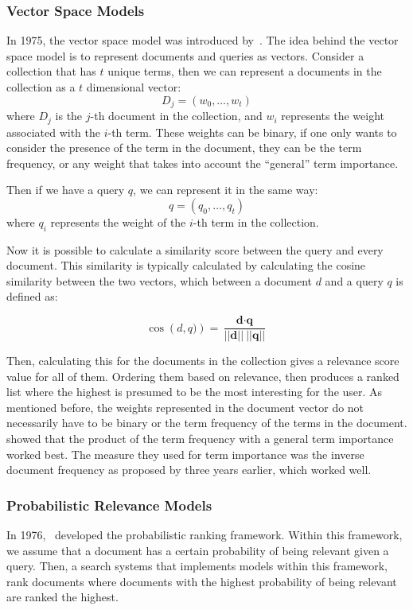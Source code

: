 \subsubsection{Vector Space Models}
In 1975, the vector space model was introduced by~\citet{VectorSpaceModel}. The idea behind the vector space model is to represent documents and queries as vectors. Consider a collection that has $t$ unique terms, then we can represent a documents in the collection as a $t$ dimensional vector:
\begin{equation}
	D_j = (w_0, \ldots, w_t)
\end{equation}
where $D_j$ is the $j$-th document in the collection, and $w_i$ represents the weight associated with the $i$-th term. These weights can be binary, if one only wants to consider the presence of the term in the document, they can be the term frequency, or any weight that takes into account the ``general'' term importance. 

Then if we have a query $q$, we can represent it in the same way:
\begin{equation}
	q = (q_0, \ldots, q_t)
\end{equation}
where $q_i$ represents the weight of the $i$-th term in the collection. 

Now it is possible to calculate a similarity score between the query and every document. This similarity is typically calculated by calculating the cosine similarity between the two vectors, which between a document $d$ and a query $q$ is defined as:

\begin{equation}
	\cos\left(d, q)\right) = \frac{\textbf{d} \cdot \textbf{q}}{||\textbf{d}||\ ||\textbf{q}||}
\end{equation}

Then, calculating this for the documents in the collection gives a relevance score value for all of them. Ordering them based on relevance, then produces a ranked list where the highest is presumed to be the most interesting for the user. As mentioned before, the weights represented in the document vector do not necessarily have to be binary or the term frequency of the terms in the document.  showed that the product of the term frequency with a general term importance worked best. The measure they used for term importance was the inverse document frequency as proposed by \citet{idf} three years earlier, which worked well. 

\subsubsection{Probabilistic Relevance Models}
In 1976,~\citeauthor{RSJ} developed the probabilistic ranking framework. Within this framework, we assume that a document has a certain probability of being relevant given a query. Then, a search systems that implements models within this framework, rank documents where documents with the highest probability of being relevant are ranked the highest.

